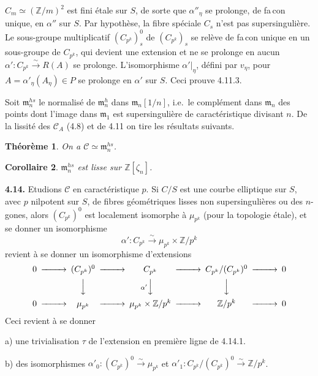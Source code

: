 \documentclass[10pt,a4paper]{amsart}
\theoremstyle{plain}
\newtheorem{theorem}{Th\'eor\`eme}[section]
\newtheorem{corollary}[theorem]{Corollaire}
\theoremstyle{definition}
\newcommand{\m}{\mathfrak{m}}
\newcommand{\cC}{\mathcal{C}}
\newcommand{\ZZ}{\mathbb{Z}}
\begin{document}
$C_m \simeq (\ZZ/m)^2$ est fini \'etale sur $S$, de sorte que $\alpha''_\eta$ se prolonge, de fa\,con unique, en $\alpha''$ sur $S$. Par hypoth\`ese, la fibre sp\'eciale $C_s$ n'est pas supersinguli\`ere. Le sous-groupe multiplicatif $(C_{p^k})_s^0$ de $(C_{p^k})_s$ se rel\`eve de fa\,con unique en un sous-groupe de $C_{p^k}$, qui devient une extension et ne se prolonge en aucun $\alpha' : C_{p^k} \xrightarrow{\sim} R(A)$ se prolonge. L'isomorphisme $\alpha'|_\eta$, d\'efini par $v_\eta$, pour $A = \alpha'_\eta(A_\eta) \in P$ se prolonge en $\alpha'$ sur $S$. Ceci prouve 4.11.3.

Soit $\m_n^{hs}$ le normalis\'e de $\m_n^h$ dans $\m_n[1/n]$, i.e.\ le compl\'ement dans $\m_n$ des points dont l'image dans $\m_1$ est supersinguli\`ere de caract\'eristique divisant $n$. De la lissit\'e des $\cC_A$ (4.8) et de 4.11 on tire les r\'esultats suivants.

\setcounter{theorem}{11}
\begin{theorem}
On a $\cC \simeq \m_n^{hs}$.
\end{theorem}

\begin{corollary}
$\m_n^{hs}$ est lisse sur $\ZZ[\zeta_n]$.
\end{corollary}

\medskip\noindent\textbf{4.14.} Etudions $\cC$ en caract\'eristique $p$. Si $C/S$ est une courbe elliptique sur $S$, avec $p$ nilpotent sur $S$, de fibres g\'eom\'etriques lisses non supersinguli\`eres ou des $n$-gones, alors $(C_{p^k})^0$ est localement isomorphe \`a $\mu_{p^k}$ (pour la topologie \'etale), et se donner un isomorphisme
\[
\alpha' : C_{p^k} \xrightarrow{\sim} \mu_{p^k} \times \ZZ/p^k
\]
revient \`a se donner un isomorphisme d'extensions
\begin{equation}
\begin{CD}
0 @>>> (C_{p^k})^0 @>>> C_{p^k} @>>> C_{p^k}/(C_{p^k})^0 @>>> 0 \\
@. @VVV @V{\alpha'}VV @VVV @. \\
0 @>>> \mu_{p^k} @>>> \mu_{p^k} \times \ZZ/p^k @>>> \ZZ/p^k @>>> 0
\end{CD}
\end{equation}
Ceci revient \`a se donner

a) une trivialisation $\tau$ de l'extension en premi\`ere ligne de 4.14.1.

b) des isomorphismes $\alpha'_0 : (C_{p^k})^0 \xrightarrow{\sim} \mu_{p^k}$ et $\alpha'_1 : C_{p^k}/(C_{p^k})^0 \xrightarrow{\sim} \ZZ/p^k$.
\end{document}
